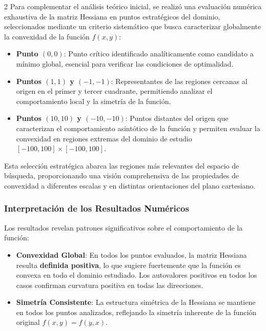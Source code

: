 \documentclass[11pt, a4paper, twocolumn]{beamer}
\begin{document}
	\begin{multicols}{2}
		Para complementar el análisis teórico inicial, se realizó una evaluación numérica exhaustiva de la matriz Hessiana en puntos estratégicos del dominio, seleccionados mediante un criterio sistemático que busca caracterizar globalmente la convexidad de la función $f(x,y)$:
		
		\begin{itemize}
			\item \textbf{Punto $(0,0)$}: Punto crítico identificado analíticamente como candidato a mínimo global, esencial para verificar las condiciones de optimalidad.
			
			\item \textbf{Puntos $(1,1)$ y $(-1,-1)$}: Representantes de las regiones cercanas al origen en el primer y tercer cuadrante, permitiendo analizar el comportamiento local y la simetría de la función.
			
			\item \textbf{Puntos $(10,10)$ y $(-10,-10)$}: Puntos distantes del origen que caracterizan el comportamiento asintótico de la función y permiten evaluar la convexidad en regiones extremas del dominio de estudio $[-100, 100] \times [-100, 100]$.
		\end{itemize}
			Esta selección estratégica abarca las regiones más relevantes del espacio de búsqueda, proporcionando una visión comprehensiva de las propiedades de convexidad a diferentes escalas y en distintas orientaciones del plano cartesiano.
	\subsubsection{Interpretación de los Resultados Numéricos}
	
	Los resultados revelan patrones significativos sobre el comportamiento de la función:
	
	\begin{itemize}
		\item \textbf{Convexidad Global}: En todos los puntos evaluados, la matriz Hessiana resulta \textbf{definida positiva}, lo que sugiere fuertemente que la función es convexa en todo el dominio estudiado. Los autovalores positivos en todos los casos confirman curvatura positiva en todas las direcciones.
		
		\item \textbf{Simetría Consistente}: La estructura simétrica de la Hessiana se mantiene en todos los puntos analizados, reflejando la simetría inherente de la función original $f(x,y) = f(y,x)$.
		

\end{itemize}
\end{multicols}
\end{document}
